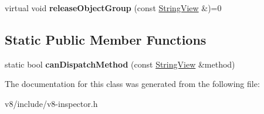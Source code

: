 \begin{DoxyCompactItemize}
\item 
\mbox{\label{classv8__inspector_1_1V8InspectorSession_a3a7e04f754c93086d7e61ad483bd38aa}} 
virtual void {\bfseries release\+Object\+Group} (const \mbox{\hyperlink{classv8__inspector_1_1StringView}{String\+View}} \&)=0
\end{DoxyCompactItemize}
\subsection*{Static Public Member Functions}
\begin{DoxyCompactItemize}
\item 
\mbox{\label{classv8__inspector_1_1V8InspectorSession_a34718345c6d8f43eb07222af2fd8c232}} 
static bool {\bfseries can\+Dispatch\+Method} (const \mbox{\hyperlink{classv8__inspector_1_1StringView}{String\+View}} \&method)
\end{DoxyCompactItemize}


The documentation for this class was generated from the following file\+:\begin{DoxyCompactItemize}
\item 
v8/include/v8-\/inspector.\+h\end{DoxyCompactItemize}
